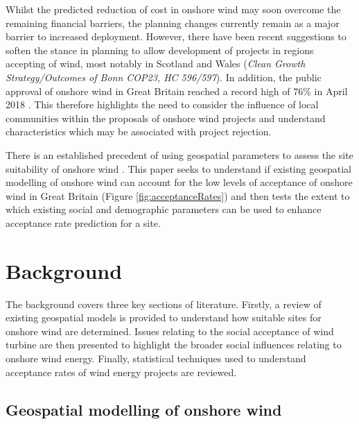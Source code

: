 \documentclass[a4paper,]{article}
\theoremstyle{definition}
\theoremstyle{definition}
\theoremstyle{definition}
\theoremstyle{remark}
\begin{document}
Whilst the predicted reduction of cost in onshore wind may soon overcome the remaining financial barriers, the planning changes currently remain as a major barrier to increased deployment. However, there have been recent suggestions to soften the stance in planning to allow development of projects in regions accepting of wind, most notably in Scotland and Wales (\emph{Clean Growth Strategy/Outcomes of Bonn COP23, HC 596/597}). In addition, the public approval of onshore wind in Great Britain reached a record high of 76\% in April 2018 \citep{DBIES2018}. This therefore highlights the need to consider the influence of local communities within the proposals of onshore wind projects and understand characteristics which may be associated with project rejection.

There is an established precedent of using geospatial parameters to assess the site suitability of onshore wind \citep{Voivontas1998, Baban2001}. This paper seeks to understand if existing geospatial modelling of onshore wind can account for the low levels of acceptance of onshore wind in Great Britain (Figure \ref{fig:acceptanceRates}) and then tests the extent to which existing social and demographic parameters can be used to enhance acceptance rate prediction for a site.

\hypertarget{background}{%
\section{Background}\label{background}}

The background covers three key sections of literature. Firstly, a review of existing geospatial models is provided to understand how suitable sites for onshore wind are determined. Issues relating to the social acceptance of wind turbine are then presented to highlight the broader social influences relating to onshore wind energy. Finally, statistical techniques used to understand acceptance rates of wind energy projects are reviewed.

\hypertarget{GIS}{%
\subsection{Geospatial modelling of onshore wind}\label{GIS}}
\end{document}
